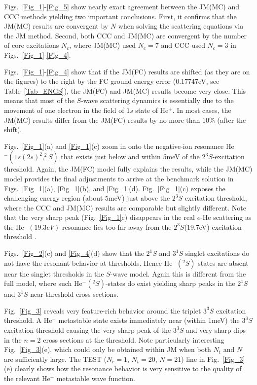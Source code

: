 \documentclass[aip
, pra
, showpacs
, aps
, twocolumn
, groupedaddress
, floatfix
]{revtex4}
\begin{document}
Figs.~\ref{Fig_1}-\ref{Fig_5} show nearly exact agreement between the JM(MC) and CCC methods yielding two important conclusions.
First, it confirms that the JM(MC) results are convergent by $N$ when solving the scattering equations via the JM method.
Second, both CCC and JM(MC) are convergent by the number of core excitations $N_c$, where JM(MC) used $N_c=7$ and CCC used $N_c=3$ in Figs.~\ref{Fig_1}-\ref{Fig_4}.


Figs.~\ref{Fig_1}-\ref{Fig_4} show that if the JM(FC) results are shifted (as they are on the figures) to the right by the FC ground energy error (0.17747eV, see Table~\ref{Tab_ENGS}),
the JM(FC) and JM(MC) results become very close. This means that most of the $S$-wave scattering dynamics  is essentially due to
the movement of one electron in the field of $1s$ state of He$^+$. In most cases, the JM(MC) results differ from the JM(FC) results by no more than 10\% (after the shift).


Figs.~\ref{Fig_1}(a) and \ref{Fig_1}(c) zoom in onto the negative-ion resonance He$^-(1s(2s)^2,^2S)$ that exists just below and within 5meV of the $2^3S$-excitation threshold.
Again, the JM(FC) model fully explains the results, while the JM(MC) model provides the final adjustments to arrive at the benchmark solution in Figs.~\ref{Fig_1}(a), \ref{Fig_1}(b), and \ref{Fig_1}(d).
Fig.~\ref{Fig_1}(c) exposes the challenging energy region (about 5meV) just above the $2^3S$ excitation threshold,
where the CCC and JM(MC) results are comparable but slightly different.
Note that the very sharp peak (Fig.~\ref{Fig_1}c) disappears in the real $e$-He scattering
\cite{KM95pL139, HBSBB96} as the He$^-(19.3eV)$ resonance \cite{Schulz73, BC94, HY99}
lies too far away from the $2^3S$(19.7eV) excitation threshold \cite{HBSBB96}.


Figs.~\ref{Fig_2}(c) and \ref{Fig_4}(d) show that the $2^1S$ and $3^1S$ singlet excitations do not have the resonant behavior at thresholds.
Hence He$^-(^2S)$-states are absent near the singlet thresholds in the $S$-wave model.
Again this is different from the full model, where such He$^-(^2S)$-states do exist yielding sharp
peaks in the $2^1S$ \cite{KM95pL139, HBSBB96} and $3^1S$ \cite{SMC2006} near-threshold cross sections.


Fig.~\ref{Fig_3} reveals very feature-rich  behavior around the triplet $3^3S$  excitation threshold.
A He$^-$ metastable state exists immediately near (within 1meV) the  $3^3S$  excitation threshold
causing the very sharp peak of the $3^3S$ and very sharp dips in the $n=2$ cross sections at the threshold.
Note particularly interesting Fig.~\ref{Fig_3}(e), which could only be obtained within JM when both $N_t$ and $N$ are sufficiently large.
The TEST ($N_c=1$, $N_t=20$, $N=21$) line in Fig.~\ref{Fig_3}(e) clearly shows how the resonance behavior is very sensitive to the quality of the relevant He$^-$ metastable wave function.
\end{document}
